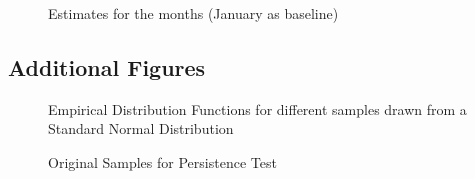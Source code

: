 \documentclass[12pt, a4paper]{article}
\theoremstyle{MAstyle} \newtheorem{assumption}{Assumption}[section]
\theoremstyle{MAstyle} \newtheorem{definition}{Definition}[section]
\theoremstyle{MAstyle} \newtheorem{theorem}{Theorem}[section]
\begin{document}
			\begin{figure}[H]
				\caption{Estimates for the months (January as baseline)}
				\label{estimates_months}
			\end{figure}
			
		\subsection{Additional Figures}\label{add_figures}
			\begin{figure}[H]
				\caption{Empirical Distribution Functions for different samples drawn from a Standard Normal Distribution}
				\label{ecdf_plot}
			\end{figure}
		
			\begin{figure}[H]
				\caption{Original Samples for Persistence Test}
				\label{persistence_samples}
			\end{figure}
			
\end{document}

